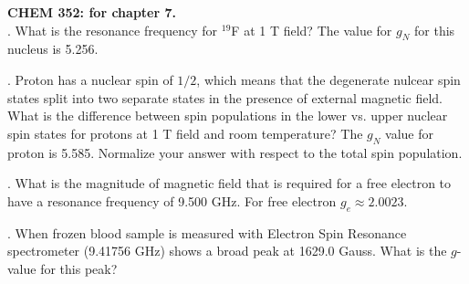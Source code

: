 \noindent
\textbf{CHEM 352:
 for chapter 7.}\\

. What is the resonance frequency for $^{19}$F at 1 T field? The value for $g_N$ for this nucleus is 5.256.\\


. Proton has a nuclear spin of $1/2$, which means that the degenerate nulcear spin states split into two separate states in the presence of 
external magnetic field. What is the difference between spin populations in the lower vs. upper nuclear spin states for protons 
at 1 T field and room temperature? The $g_N$ value for proton is 5.585. Normalize your answer with respect to the total spin population.\\


. What is the magnitude of magnetic field that is required for a free electron to have a resonance frequency of 9.500 GHz. 
For free electron $g_e \approx 2.0023$.\\


. When frozen blood sample is measured with Electron Spin Resonance spectrometer (9.41756 GHz) shows a broad peak at 1629.0 Gauss.
What is the $g$-value for this peak?\\

 

